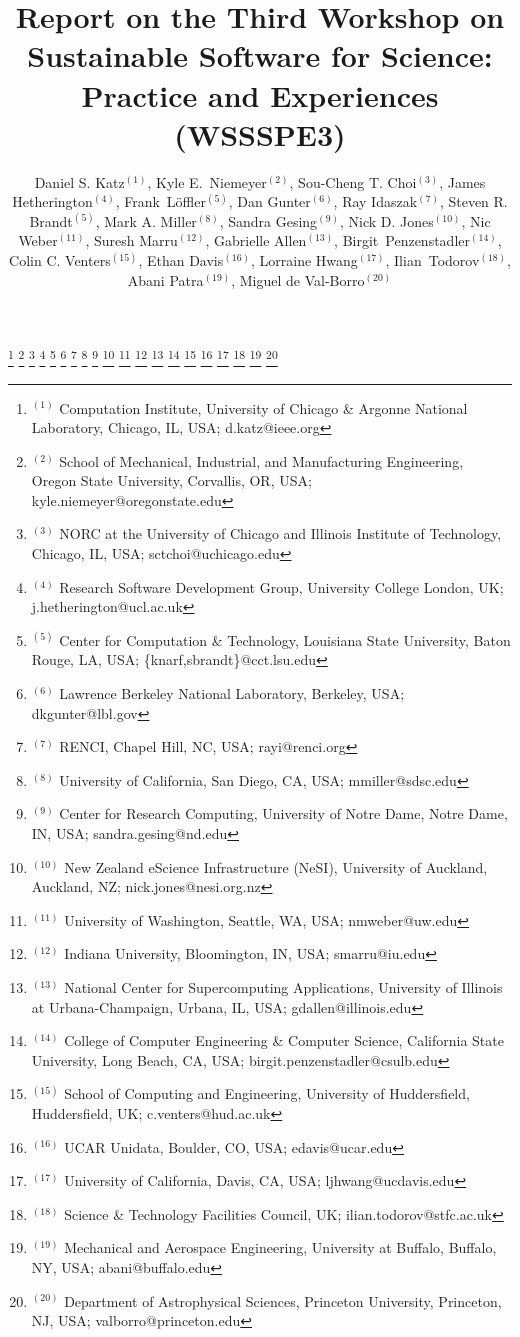 \documentclass[11pt, oneside]{amsart}
\begin{document}
\title[]{Report on the Third Workshop on Sustainable Software for Science: Practice and Experiences (WSSSPE3)}

\author{Daniel S. Katz$^{(1)}$,
Kyle E.\ Niemeyer$^{(2)}$,
Sou-Cheng T. Choi$^{(3)}$,
James Hetherington$^{(4)}$,
Frank~L\"{o}ffler$^{(5)}$,
Dan Gunter$^{(6)}$,
Ray Idaszak$^{(7)}$,
Steven R. Brandt$^{(5)}$,
Mark A. Miller$^{(8)}$,
Sandra Gesing$^{(9)}$,
Nick D. Jones$^{(10)}$,
Nic Weber$^{(11)}$,
Suresh Marru$^{(12)}$,
Gabrielle Allen$^{(13)}$,
Birgit~Penzenstadler$^{(14)}$,
Colin C. Venters$^{(15)}$,
Ethan Davis$^{(16)}$,
Lorraine Hwang$^{(17)}$,
Ilian~Todorov$^{(18)}$,
Abani Patra$^{(19)}$,
Miguel de Val-Borro$^{(20)}$
}


%
\thanks{{}$^{(1)}$ Computation Institute, 
University of Chicago \& Argonne National Laboratory, Chicago, IL, USA; d.katz@ieee.org}
%
\thanks{{}$^{(2)}$ School of Mechanical, Industrial, and Manufacturing Engineering, 
Oregon State University, Corvallis, OR, USA; kyle.niemeyer@oregonstate.edu}
%
\thanks{{}$^{(3)}$ NORC at the University of Chicago and Illinois Institute of Technology, Chicago, IL, USA; sctchoi@uchicago.edu}
%
\thanks{{}$^{(4)}$ Research Software Development Group, University College London, UK; j.hetherington@ucl.ac.uk}
%
\thanks{{}$^{(5)}$ Center for Computation \& Technology, Louisiana State University, Baton Rouge, LA, USA; \{knarf,sbrandt\}@cct.lsu.edu}
%
\thanks{{}$^{(6)}$ Lawrence Berkeley National Laboratory, Berkeley, USA; dkgunter@lbl.gov}
%
\thanks{{}$^{(7)}$ RENCI, Chapel Hill, NC, USA; rayi@renci.org}
%
\thanks{{}$^{(8)}$ University of California, San Diego, CA, USA; mmiller@sdsc.edu}
%
\thanks{{}$^{(9)}$ Center for Research Computing, University of Notre Dame, Notre Dame, IN, USA; sandra.gesing@nd.edu}
%
\thanks{{}$^{(10)}$ New Zealand eScience Infrastructure (NeSI), University of Auckland, Auckland, NZ; nick.jones@nesi.org.nz}
%
\thanks{{}$^{(11)}$ University of Washington, Seattle, WA, USA; nmweber@uw.edu}
%
\thanks{{}$^{(12)}$ Indiana University, Bloomington, IN, USA; smarru@iu.edu}
%
\thanks{{}$^{(13)}$ National Center for Supercomputing Applications, University of Illinois at Urbana-Champaign, Urbana, IL, USA; gdallen@illinois.edu}
%
\thanks{{}$^{(14)}$ College of Computer Engineering \& Computer Science, California State University, Long Beach, CA, USA; birgit.penzenstadler@csulb.edu}
%
\thanks{{}$^{(15)}$ School of Computing and Engineering, University of Huddersfield, Huddersfield, UK; c.venters@hud.ac.uk}
%
\thanks{{}$^{(16)}$ UCAR Unidata, Boulder, CO, USA; edavis@ucar.edu}
%
\thanks{{}$^{(17)}$  University of California, Davis, CA, USA; ljhwang@ucdavis.edu}
%
\thanks{{}$^{(18)}$ Science \& Technology Facilities Council, UK; ilian.todorov@stfc.ac.uk}
%
\thanks{{}$^{(19)}$ Mechanical and Aerospace Engineering, University at Buffalo, Buffalo, NY, USA; abani@buffalo.edu}
%
\thanks{{}$^{(20)}$ Department of Astrophysical Sciences, Princeton University, Princeton, NJ, USA; valborro@princeton.edu}
%
 
\end{document}
